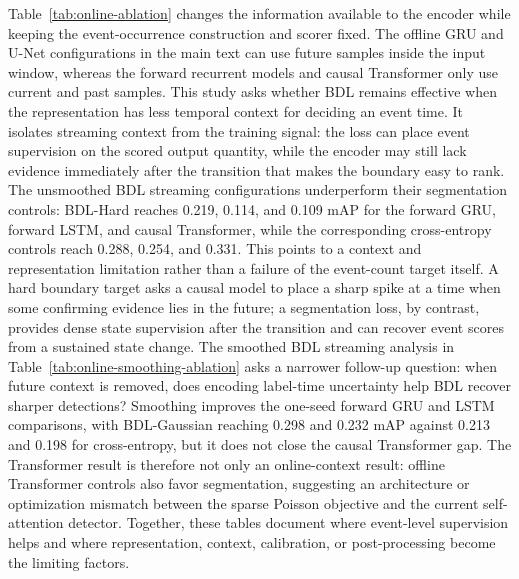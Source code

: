 Table~\ref{tab:online-ablation} changes the information available to the encoder while keeping the event-occurrence construction and scorer fixed.
The offline GRU and U-Net configurations in the main text can use future samples inside the input window, whereas the forward recurrent models and causal Transformer only use current and past samples.
This study asks whether BDL remains effective when the representation has less temporal context for deciding an event time.
It isolates streaming context from the training signal: the loss can place event supervision on the scored output quantity, while the encoder may still lack evidence immediately after the transition that makes the boundary easy to rank.
The unsmoothed BDL streaming configurations underperform their segmentation controls: BDL-Hard reaches 0.219, 0.114, and 0.109 mAP for the forward GRU, forward LSTM, and causal Transformer, while the corresponding cross-entropy controls reach 0.288, 0.254, and 0.331.
This points to a context and representation limitation rather than a failure of the event-count target itself.
A hard boundary target asks a causal model to place a sharp spike at a time when some confirming evidence lies in the future; a segmentation loss, by contrast, provides dense state supervision after the transition and can recover event scores from a sustained state change.
The smoothed BDL streaming analysis in Table~\ref{tab:online-smoothing-ablation} asks a narrower follow-up question: when future context is removed, does encoding label-time uncertainty help BDL recover sharper detections?
Smoothing improves the one-seed forward GRU and LSTM comparisons, with BDL-Gaussian reaching 0.298 and 0.232 mAP against 0.213 and 0.198 for cross-entropy, but it does not close the causal Transformer gap.
The Transformer result is therefore not only an online-context result: offline Transformer controls also favor segmentation, suggesting an architecture or optimization mismatch between the sparse Poisson objective and the current self-attention detector.
Together, these tables document where event-level supervision helps and where representation, context, calibration, or post-processing become the limiting factors.

\begin{center}
\centering
\label{tab:seizure-replication}

\end{center}

